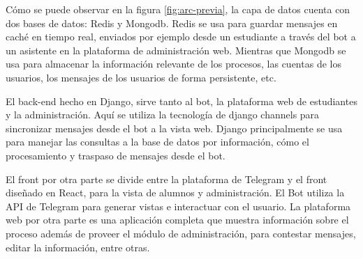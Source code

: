        \par Cómo se puede observar en la figura \ref{fig:arc-previa}, la capa de datos cuenta con dos bases de datos: \gls{Redis} y \gls{Mongodb}. \gls{Redis} se usa para guardar mensajes en caché en tiempo real, enviados por ejemplo desde un estudiante a través del bot a un asistente en la plataforma de administración web. Mientras que \gls{Mongodb} se usa para almacenar la información relevante de los procesos, las cuentas de los usuarios, los mensajes de los usuarios de forma persistente, etc.
        
        \par El back-end hecho en \gls{Django}, sirve tanto al bot, la plataforma web de estudiantes y la administración. Aquí se utiliza la tecnología de django channels para sincronizar mensajes desde el bot a la vista web. \gls{Django} principalmente se usa para manejar las consultas a la base de datos por información, cómo el procesamiento y traspaso de mensajes desde el bot.
        
        \par El front por otra parte se divide entre la plataforma de \gls{Telegram} y el front diseñado en \gls{React}, para la vista de alumnos y administración. El Bot utiliza la API de \gls{Telegram} para generar vistas e interactuar con el usuario. La plataforma web por otra parte es una aplicación completa que muestra información sobre el proceso además de proveer el módulo de administración, para contestar mensajes, editar la información, entre otras.

